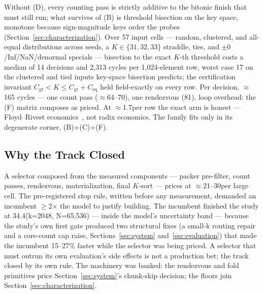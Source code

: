 Without (D), every counting pass is strictly additive to the bitonic
finish that must still run; what survives of (B) is threshold bisection
on the key space, monotone because sign-magnitude keys order the probes
(Section~\ref{sec:characterization}). Over 57 input cells ---
random, clustered, and all-equal distributions across seeds, a
$K\in\{31,32,33\}$ straddle, ties, and $\pm 0$/Inf/NaN/denormal specials
--- bisection to the exact $K$-th threshold costs a median of 14 decisions
and 2{,}313 cycles per 1{,}024-element row, worst case 17 on the
clustered and tied inputs key-space bisection predicts; the
certification invariant
$C_{\mathrm{gt}} < K \le C_{\mathrm{gt}}{+}C_{\mathrm{eq}}$ held
field-exactly on every row. Per decision, $\approx$165 cycles --- one
count pass ($\approx$64--70), one rendezvous (81), loop
overhead: the (F) matrix composes as priced. At $\approx$1.7\us per row
the exact arm is honest ---
Floyd--Rivest economics~\cite{floydrivest1975}, not radix
economics. The family fits \bh only in its degenerate corner, (B)+(C)+(F).

\subsection{Why the Track Closed}
\label{sec:dspace-closure}

A selector composed from the measured components --- packer pre-filter,
count passes, rendezvous, materialization, final $K$-sort --- prices at
$\approx$21--30\us per large cell. The pre-registered stop rule, written
before any measurement, demanded an incumbent $\ge$2$\times$ the model to
justify building. The incumbent finished the study at 34.4\us (k=2048,
N=65{,}536) --- inside the model's uncertainty band --- because the
study's own first gate produced two structural fixes (a small-k routing
repair and a core-count cap raise, Sections~\ref{sec:system}
and~\ref{sec:evaluation}) that made the incumbent 15--27\% faster while
the selector was being priced. A selector that must outrun its own
evaluation's side effects is not a production bet; the track closed by
its own rule. The machinery was banked: the rendezvous and fold
primitives price Section~\ref{sec:system}'s chunk-skip decision; the
floors join Section~\ref{sec:characterization}.
